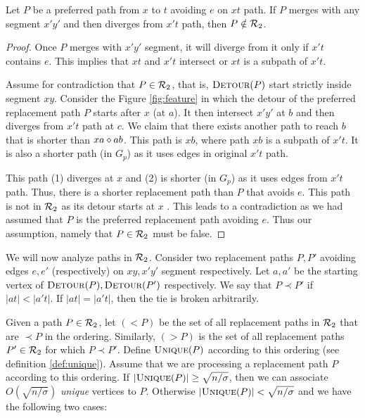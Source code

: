 \begin{lemma}
\label{lem:feature}
Let $P$ be a preferred path from $x$ to $t$ avoiding $e$ on $xt$ path.
If $P$ merges with any segment $x'y'$ and then diverges from $x't$ path, then $P \notin \mathcal{R}_2$.
\end{lemma}
\iflong
  
  \begin{proof}
  Once $P$ merges with $x'y'$ segment, it will diverge from it only if
  $x't$ contains $e$. This implies that $xt$ and $x't$ intersect or $xt$
  is a subpath of $x't$.

  \noindent Assume for contradiction that $P \in \mathcal{R}_2$, that is, $\textsc{Detour}(P)$
  start strictly inside segment $xy$. Consider the Figure \ref{fig:feature} in which
  the detour of the preferred replacement path $P$
  starts after $x$ (at $a$). It then intersect  $x'y'$ at $b$
  and then diverges from $x't$ path at $c$.
  We claim that there exists another path to reach $b$ that is shorter  than
  $xa \diamond ab$. This path is $xb$, where path $xb$ is a subpath of $x't$.
  It is also a shorter path (in $G_p$) as it uses
   edges in original $x't$ path.

  This path (1) diverges at $x$ and (2) is shorter (in $G_p$) as it uses edges from $x't$ path.
  Thus, there is a shorter replacement path than $P$ that avoids $e$. This path is not in
  $\mathcal{R}_2$ as its detour starts at $x$  .
  This leads to a contradiction as we had assumed that $P$ is the preferred replacement path avoiding $e$.
  Thus our assumption,
  namely that $P \in \mathcal{R}_2$ must be false.
  \end{proof}
\fi

\noindent We will now analyze  paths in $\mathcal{R}_2$. Consider two replacement
paths $P, P'$ avoiding edges $e,e'$ (respectively) on $xy,x'y'$ segment respectively.
Let  $a,a'$ be the starting vertex of $\textsc{Detour}(P), \textsc{Detour}(P')$ respectively.
We say that $P \prec P'$ if $|at| < |a't|$.
If $|at| = |a't|$, then the tie is broken arbitrarily.


\noindent  Given a path $P \in \mathcal{R}_2$, let $(< P)$ be the set of all replacement
paths in $\mathcal{R}_2$ that are $\prec P$ in the ordering. Similarly, $(> P)$ is
the set of all replacement paths $P' \in \mathcal{R}_2$ for which $P \prec P'$.
Define $\textsc{Unique}(P)$ according to this ordering (see definition \ref{def:unique}).
Assume that we are processing a replacement path $P$ according to this ordering.
If $|\textsc{Unique}(P)| \ge \sqrt{n/\sigma}$, then we can associate $O(\sqrt{n/\sigma})$
{\em unique} vertices to $P$. Otherwise $|\textsc{Unique}(P)| < \sqrt{n/\sigma}$ and we have the following two cases:

